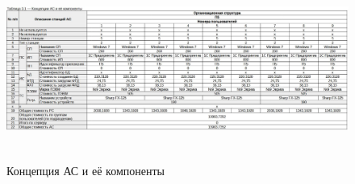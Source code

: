 \documentclass[12pt, a4paper, simple]{eskdtext}
\begin{document}
    \begin{figure}[!hp]
        \centering
        \includegraphics[height=6cm]
            {_docs/Таблица3-1КонцепцияАСИЕеКомпоненты__лаб2_П5.jpg}
        \caption{Концепция АС и её компоненты}
    \end{figure}

\end{document}
